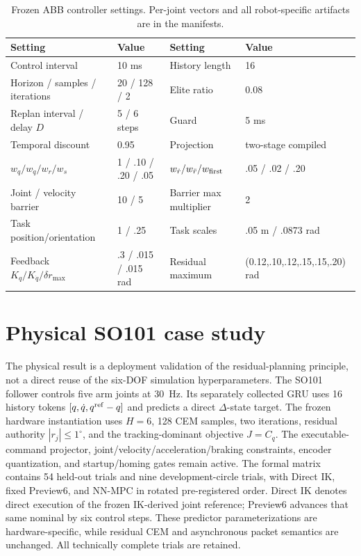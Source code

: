 \documentclass[10pt]{article}
\begin{document}
\begin{table}[h]
\centering\small
\caption{Frozen ABB controller settings. Per-joint vectors and all robot-specific
artifacts are in the manifests.}
\begin{tabular}{ll@{\qquad}ll}
\toprule
Setting & Value & Setting & Value \\
\midrule
Control interval & 10 ms & History length & 16 \\
Horizon / samples / iterations & 20 / 128 / 2 & Elite ratio & 0.08 \\
Replan interval / delay $D$ & 5 / 6 steps & Guard & 5 ms \\
Temporal discount & 0.95 & Projection & two-stage compiled \\
$w_q/w_{\dot q}/w_r/w_s$ & 1 / .10 / .20 / .05 &
$w_{\dot r}/w_{\ddot r}/w_{\rm first}$ & .05 / .02 / .20 \\
Joint / velocity barrier & 10 / 5 & Barrier max multiplier & 2 \\
Task position/orientation & 1 / .25 & Task scales & .05 m / .0873 rad \\
Feedback $K_q/K_{\dot q}/\delta r_{\max}$ & .3 / .015 / .015 rad &
Residual maximum & (0.12,.10,.12,.15,.15,.20) rad \\
\bottomrule
\end{tabular}
\end{table}

\section{Physical SO101 case study}
The physical result is a deployment validation of the residual-planning
principle, not a direct reuse of the six-DOF simulation hyperparameters. The
SO101 follower controls five arm joints at 30~Hz. Its separately collected GRU
uses 16 history tokens $[q,\dot q,q^{\rm ref}-q]$ and predicts a direct
$\Delta$-state target. The frozen hardware instantiation uses $H=6$, 128 CEM
samples, two iterations, residual authority $|r_j|\leq1^\circ$, and the
tracking-dominant objective $J=C_q$. The executable-command projector,
joint/velocity/acceleration/braking constraints, encoder quantization, and
startup/homing gates remain active. The formal matrix contains 54 held-out
trials and nine development-circle trials, with Direct IK, fixed Preview6, and
NN-MPC in rotated pre-registered order. Direct IK denotes direct execution of
the frozen IK-derived joint reference; Preview6 advances that same nominal by
six control steps. These predictor parameterizations are hardware-specific,
while residual CEM and asynchronous packet semantics are unchanged. All
technically complete trials are retained.
\end{document}
